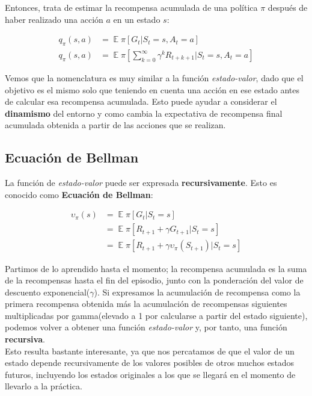 \documentclass[11pt,fleqn]{book} %
\DeclareMathOperator*{\E}{\mathbb{E}}
\begin{document}
Entonces, trata de estimar la recompensa acumulada de una política $\pi$ después de haber realizado una acción $a$ en un estado $s$:

\begin{align*}
q_\pi(s,a)&=\E\pi\left[G_t|S_t=s,A_t=a\right]\\
q_\pi(s,a)&=\E\pi\left[\sum^\infty_{k=0}\gamma^kR_{t+k+1}|S_t=s,A_t=a\right]
\end{align*}

Vemos que la nomenclatura es muy similar a la función \textit{estado-valor}, dado que el objetivo es el mismo solo que teniendo en cuenta una acción en ese estado antes de calcular esa recompensa acumulada. Esto puede ayudar a considerar el \textbf{dinamismo} del entorno y como cambia la expectativa de recompensa final acumulada obtenida a partir de las acciones que se realizan.

\subsection{Ecuación de Bellman}

La función de \textit{estado-valor} puede ser expresada \textbf{recursivamente}. Esto es conocido como \textbf{Ecuación de Bellman}:

\begin{align*}
\upsilon_\pi(s)&=\E\pi\left[G_t|S_t=s\right] \\
&= \E\pi\left[R_{t+1}+\gamma G_{t+1}|S_t=s\right]\\
&= \E\pi\left[R_{t+1}+\gamma \upsilon_\pi(S_{t+1})|S_t=s\right]
\end{align*} 

Partimos de lo aprendido hasta el momento; la recompensa acumulada es la suma de la recompensas hasta el fin del episodio, junto con la ponderación del valor de descuento exponencial($\gamma$). Si expresamos la acumulación de recompensa como la primera recompensa obtenida más la acumulación de recompensas siguientes multiplicadas por gamma(elevado a 1 por calcularse a partir del estado siguiente), podemos volver a obtener una función \textit{estado-valor} y, por tanto, una función \textbf{recursiva}.\\

Esto resulta bastante interesante, ya que nos percatamos de que el valor de un estado depende recursivamente de los valores posibles de otros muchos estados futuros, incluyendo los estados originales a los que se llegará en el momento de llevarlo a la práctica. \\
\end{document}
